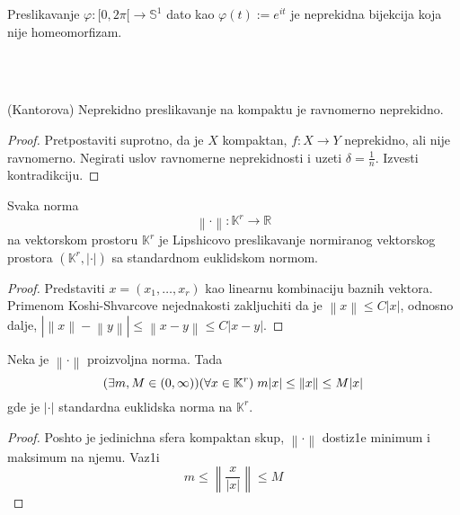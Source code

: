 \documentclass[a4paper,12pt]{article}
\newcommand{\RR}{\mathbb{R}}
\newcommand{\norm}[1]{\left\lVert#1\right\rVert}
\begin{document}
\begin{nap}
Preslikavanje $\varphi: [0,2 \pi[ \to \mathbb{S}^1$ dato kao $ \varphi(t):= e^{it}$ je neprekidna bijekcija koja nije homeomorfizam.
\end{nap} \\ \\
\begin{tma}
(Kantorova) Neprekidno preslikavanje na kompaktu je ravnomerno neprekidno.
\end{tma}
\begin{proof}
Pretpostaviti suprotno, da je $X$ kompaktan, $f:X \to Y$ neprekidno, ali nije ravnomerno. Negirati uslov ravnomerne neprekidnosti i uzeti $\delta = \frac{1}{n}$.  Izvesti kontra\-dik\-ci\-ju. 
\end{proof}

\begin{lema}
Svaka norma 
\[\norm{\cdot} : \mathbb{K}^r \to \RR \]
na vektorskom prostoru $\mathbb{K}^r$ je Lipshicovo preslikavanje normiranog vektorskog prostora $(\mathbb{K}^r, |\cdot|)$ sa standardnom euklidskom normom.
\end{lema}
\begin{proof}
Predstaviti $x = (x_1, \dots, x_r)$ kao linearnu kombinaciju baznih vektora. Primenom Koshi-Shvarcove nejednakosti zakljuchiti da je $\norm{x} \leq C |x|$, odnosno dalje, $|\norm{x} - \norm{y} | \leq \norm{x-y} \leq C |x-y|$.
\end{proof}

\begin{tvr}
Neka je $\norm{\cdot}$ proizvoljna norma. Tada 
\[(\exists m,M \in (0,\infty) ) (\forall x \in \mathbb{K}^r) \hspace{0.1cm} m|x| \leq \norm{x} \leq M|x| \]
gde je $|\cdot|$ standardna euklidska norma na $\mathbb{K}^r$.
\end{tvr}
\begin{proof}
Poshto je jedinichna sfera kompaktan skup, $\norm{\cdot}$ dostiz1e minimum i maksimum na njemu. Vaz1i
 \[ m \leq \norm{\frac{x}{|x|}} \leq M\]
\end{proof}
\end{document}

